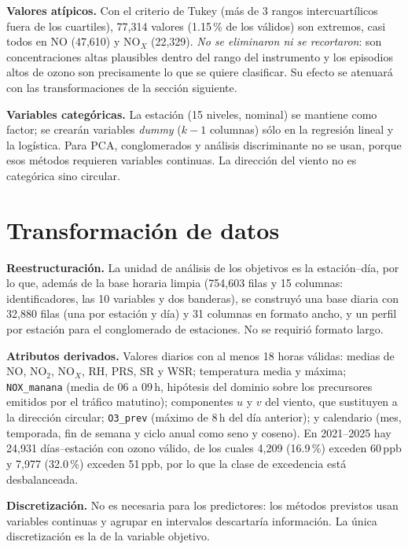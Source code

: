 \documentclass[11pt,letterpaper]{article}
\begin{document}
\textbf{Valores at\'ipicos.} Con el criterio de Tukey (m\'as de 3 rangos intercuart\'ilicos fuera de los cuartiles), 77,314 valores (1.15\,\% de los v\'alidos) son extremos, casi todos en NO (47,610) y NO$_X$ (22,329). \emph{No se eliminaron ni se recortaron}: son concentraciones altas plausibles dentro del rango del instrumento y los episodios altos de ozono son precisamente lo que se quiere clasificar. Su efecto se atenuar\'a con las transformaciones de la secci\'on siguiente.

\textbf{Variables categ\'oricas.} La estaci\'on (15 niveles, nominal) se mantiene como factor; se crear\'an variables \textit{dummy} ($k-1$ columnas) s\'olo en la regresi\'on lineal y la log\'istica. Para PCA, conglomerados y an\'alisis discriminante no se usan, porque esos m\'etodos requieren variables continuas. La direcci\'on del viento no es categ\'orica sino circular.

\section{Transformaci\'on de datos}
\textbf{Reestructuraci\'on.} La unidad de an\'alisis de los objetivos es la estaci\'on--d\'ia, por lo que, adem\'as de la base horaria limpia (754,603 filas y 15 columnas: identificadores, las 10 variables y dos banderas), se construy\'o una base diaria con 32,880 filas (una por estaci\'on y d\'ia) y 31 columnas en formato ancho, y un perfil por estaci\'on para el conglomerado de estaciones. No se requiri\'o formato largo.

\textbf{Atributos derivados.} Valores diarios con al menos 18 horas v\'alidas: medias de NO, NO$_2$, NO$_X$, RH, PRS, SR y WSR; temperatura media y m\'axima; \texttt{NOX\_manana} (media de 06 a 09\,h, hip\'otesis del dominio sobre los precursores emitidos por el tr\'afico matutino); componentes $u$ y $v$ del viento, que sustituyen a la direcci\'on circular; \texttt{O3\_prev} (m\'aximo de 8\,h del d\'ia anterior); y calendario (mes, temporada, fin de semana y ciclo anual como seno y coseno). En 2021--2025 hay 24,931 d\'ias--estaci\'on con ozono v\'alido, de los cuales 4,209 (16.9\,\%) exceden 60\,ppb y 7,977 (32.0\,\%) exceden 51\,ppb, por lo que la clase de excedencia est\'a desbalanceada.

\textbf{Discretizaci\'on.} No es necesaria para los predictores: los m\'etodos previstos usan variables continuas y agrupar en intervalos descartar\'ia informaci\'on. La \'unica discretizaci\'on es la de la variable objetivo.
\end{document}
